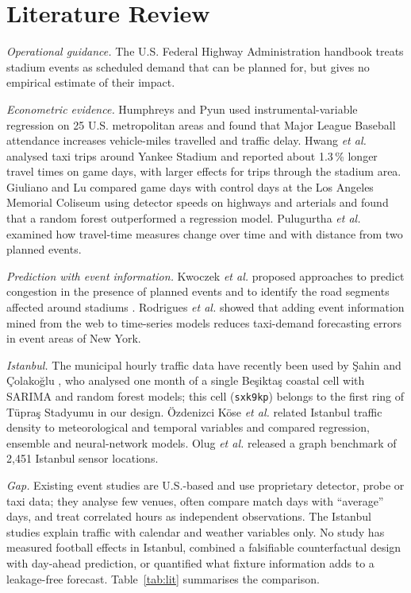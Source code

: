 \documentclass[conference]{IEEEtran}
\begin{document}
\section{Literature Review}
\textit{Operational guidance.} The U.S. Federal Highway Administration handbook \cite{fhwa2003} treats stadium events as scheduled demand that can be planned for, but gives no empirical estimate of their impact.

\textit{Econometric evidence.} Humphreys and Pyun \cite{humphreys2018} used instrumental-variable regression on 25 U.S. metropolitan areas and found that Major League Baseball attendance increases vehicle-miles travelled and traffic delay. Hwang \textit{et al.} \cite{hwang2025} analysed taxi trips around Yankee Stadium and reported about 1.3\,\% longer travel times on game days, with larger effects for trips through the stadium area. Giuliano and Lu \cite{giuliano2021} compared game days with control days at the Los Angeles Memorial Coliseum using detector speeds on highways and arterials and found that a random forest outperformed a regression model. Pulugurtha \textit{et al.} \cite{pulugurtha2020} examined how travel-time measures change over time and with distance from two planned events.

\textit{Prediction with event information.} Kwoczek \textit{et al.} proposed approaches to predict congestion in the presence of planned events \cite{kwoczek2014} and to identify the road segments affected around stadiums \cite{kwoczek2015}. Rodrigues \textit{et al.} \cite{rodrigues2019} showed that adding event information mined from the web to time-series models reduces taxi-demand forecasting errors in event areas of New York.

\textit{Istanbul.} The municipal hourly traffic data have recently been used by \c{S}ahin and Çolako\u{g}lu \cite{sahin2025}, who analysed one month of a single Be\c{s}ikta\c{s} coastal cell with SARIMA and random forest models; this cell (\texttt{sxk9kp}) belongs to the first ring of Tüpra\c{s} Stadyumu in our design. Özdenizci Köse \textit{et al.} \cite{ozdenizci2025} related Istanbul traffic density to meteorological and temporal variables and compared regression, ensemble and neural-network models. Olug \textit{et al.} \cite{olug2024} released a graph benchmark of 2,451 Istanbul sensor locations.

\textit{Gap.} Existing event studies are U.S.-based and use proprietary detector, probe or taxi data; they analyse few venues, often compare match days with ``average'' days, and treat correlated hours as independent observations. The Istanbul studies explain traffic with calendar and weather variables only. No study has measured football effects in Istanbul, combined a falsifiable counterfactual design with day-ahead prediction, or quantified what fixture information adds to a leakage-free forecast. Table~\ref{tab:lit} summarises the comparison.
\end{document}
